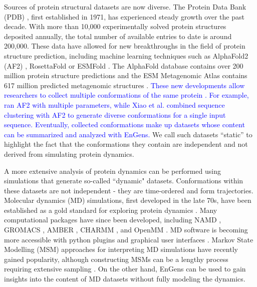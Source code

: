 \documentclass[unnumsec,webpdf,contemporary,large,numsquare]{oup-authoring-template}%
\theoremstyle{thmstyleone}%
\theoremstyle{thmstyletwo}%
\theoremstyle{thmstylethree}%
\begin{document}
Sources of protein structural datasets are now diverse. The Protein Data Bank (PDB) \citep{wwpdb_consortium_protein_2019, burley_rcsb_2021}, first established in 1971, has experienced steady growth over the past decade. With more than 10,000 experimentally solved protein structures deposited annually, the total number of available entries to date is around 200,000. These data have allowed for new breakthroughs in the field of protein structure prediction, including machine learning techniques such as AlphaFold2 (AF2) \citep{jumper_highly_2021}, RosettaFold \citep{baek_accurate_2021} or ESMFold \citep{lin_evolutionary-scale_2022}. The AlphaFold database contains over 200 million protein structure predictions and the ESM Metagenomic Atlas contains 617 million predicted metagenomic structures \citep{varadi_alphafold_2022}. \textcolor{blue}{These new developments allow researchers to collect multiple conformations of the same protein  \citep{takei_how_2022, xiao_utilization_2022, mikhaylov_accurate_2023, wayment-steele_prediction_2022}. For example, \citet{takei_how_2022} ran AF2 with multiple parameters, while Xiao et al. \citep{xiao_utilization_2022} combined sequence clustering with AF2 to generate diverse conformations for a single input sequence. Eventually, collected conformations make up datasets whose content can be summarized and analyzed with EnGens.}  We call such datasets ``static'' to highlight the fact that the conformations they contain are independent and not derived from simulating protein dynamics.

A more extensive analysis of protein dynamics can be performed using simulations that generate so-called ``dynamic" datasets. Conformations within these datasets are not independent - they are time-ordered and form trajectories. Molecular dynamics (MD) simulations, first developed in the late 70s, have been established as a gold standard for exploring protein dynamics \citep{warshel_theoretical_1976}. Many computational packages have since been developed, including NAMD \citep{phillips_scalable_2020}, GROMACS \citep{bekker_gromacs_1993, berendsen_gromacs_1995}, AMBER \citep{salomon-ferrer_overview_2013}, CHARMM \citep{brooks_charmm_2009}, and OpenMM \citep{eastman_openmm_2017}. MD software is becoming more accessible with python plugins and graphical user interfaces \citep{barhaghi_py-mcmd_2022}. Markov State Modelling (MSM) approaches for interpreting MD simulations have recently gained popularity, although constructing MSMs can be a lengthy process requiring extensive sampling \citep{prinz_markov_2011}. On the other hand, EnGens can be used to gain insights into the content of MD datasets without fully modeling the dynamics.
\end{document}
